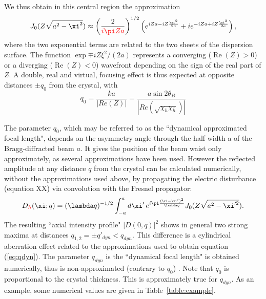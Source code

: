 \documentclass[preprint]{iucr}              %
\newcommand{\inblue}[1]{{\color{blue}#1}}
\newcommand{\inred}[1]{{\color{red}#1}}
\begin{document}
We thus obtain in this central region the approximation
\begin{equation}
\label{eq:approximatedDiffractedField}
    J_0(Z\sqrt{a^2-\xi^2})\approx \left(\frac{2}{\inred{i \pi Z a}}\right)^{1/2} \left( e^{iZa-i Z\frac{ \xi^2}{2a}} + i 
    e^{-i Z a+i Z\frac{\xi^2}{2a}} \right),
\end{equation}
where the two exponential terms are related to the two sheets of the dispersion surface. 
The function $\exp{\mp i Z \xi^2 / (2 a)}$ %
represents a converging \inblue{($\operatorname{Re}(Z)>0$)} or a diverging \inblue{($\operatorname{Re}(Z)<0$)} wavefront depending on the sign of the real part of $Z$. A double, real and virtual, focusing effect is thus expected at opposite distances $\pm q_0$ from the crystal, with
\begin{equation}
\label{eq:qdyn}
    q_0 = \frac{k a}{|Re(Z)|}= \frac{a \sin2\theta_B}{|Re(\sqrt{\chi_h\chi_{\bar h}})|}
\end{equation}

The parameter $q_0$, which may be referred to as the ``dynamical \inblue{approximated} focal length", depends on the asymmetry angle \inblue{through} the half-width a of the Bragg-diffracted beam $a$. \inblue{It gives the position of the beam waist only approximately, as several approximations have been used}. However the reflected amplitude at any distance $q$ from the crystal can be calculated numerically, without the approximations used above, \inblue{by propagating the electric disturbance (equation XX)} via convolution with the Fresnel propagator:
\begin{equation}
\label{eq:Dh}
    D\inred{_h}(\xi; q) = (\lambda q)^{-1/2} \int_{-a}^a d\xi'  \, e^{i \pi \frac{(\xi-\xi')^2}{\lambda q}} J_0(Z \sqrt{a^2-\xi'^2}).
\end{equation}
The resulting ``axial intensity profile" $|D(0,q)|^2$ shows in general two strong maxima at distances $q_{1,2}=\pm q'_{dyn} < q_{dyn}$. This difference is a cylindrical aberration effect related to the approximations used to obtain equation (\ref{eq:qdyn}). \inblue{The parameter $q_{dyn}$ is the ``dynamical focal length" is obtained numerically, thus is non-approximated (contrary to $q_0$)} . Note that $q_0$ is proportional to the crystal thickness. This is \inred{approximately true} for $q_{dyn}$. As an example, some numerical values are given in Table~\ref{table:example}.
\end{document}
